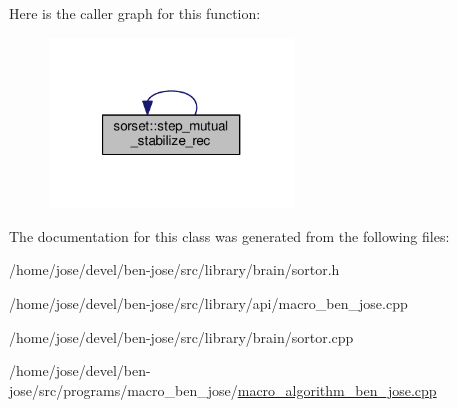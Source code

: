 Here is the caller graph for this function\+:\nopagebreak
\begin{figure}[H]
\begin{center}
\leavevmode
\includegraphics[width=184pt]{d3/d62/classsorset_a9a85b9412bc1fc5bea86d416e52b55c7_icgraph}
\end{center}
\end{figure}




The documentation for this class was generated from the following files\+:\begin{DoxyCompactItemize}
\item 
/home/jose/devel/ben-\/jose/src/library/brain/sortor.\+h\item 
/home/jose/devel/ben-\/jose/src/library/api/macro\+\_\+ben\+\_\+jose.\+cpp\item 
/home/jose/devel/ben-\/jose/src/library/brain/sortor.\+cpp\item 
/home/jose/devel/ben-\/jose/src/programs/macro\+\_\+ben\+\_\+jose/\hyperlink{macro__algorithm__ben__jose_8cpp}{macro\+\_\+algorithm\+\_\+ben\+\_\+jose.\+cpp}\end{DoxyCompactItemize}
